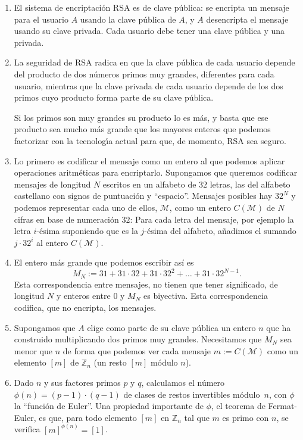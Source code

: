 \begin{enumerate}
 \item El sistema de encriptaci\'on RSA es de clave p\'ublica: se encripta un
mensaje para el usuario $A$ usando la clave p\'ublica de $A$, y $A$ desencripta
el mensaje usando su clave privada. Cada usuario debe tener una clave p\'ublica
y una privada. 
 \item La seguridad de RSA radica en que la clave p\'ublica de cada usuario
depende del producto de dos n\'umeros primos muy grandes, diferentes para cada
usuario, mientras que la clave privada de cada usuario depende de los dos primos
cuyo producto forma parte de su clave p\'ublica.
 
 Si los primos son muy grandes su producto lo es m\'as, y basta que ese producto
sea mucho m\'as grande que los mayores enteros que podemos factorizar con la
tecnolog\'{\i}a actual para que, de momento, RSA sea seguro.
 
 \item Lo primero es codificar el mensaje como un entero al que podemos aplicar
operaciones aritm\'eticas para encriptarlo.  Supongamos que queremos codificar
mensajes de longitud $N$ escritos en un alfabeto de $32$ letras, las del
alfabeto castellano con signos de puntuaci\'on y ``espacio''.  Mensajes posibles
hay $32^N$ y podemos representar cada uno de ellos, $\mathcal{M}$, como un 
entero
$C(\mathcal{M})$ de $N$ cifras en base de numeraci\'on $32$: Para cada letra del
mensaje, por ejemplo  la letra $i$-\'esima suponiendo que es la $j$-\'esima del
alfabeto,   a\~nadimos el sumando $j\cdot 32^i$ al entero $C(\mathcal{M})$. 
 
 \item El entero m\'as grande que podemos escribir as\'i es 
 \[M_{N}:=31+31\cdot 32+31\cdot 32^2+\dots+31\cdot 32^{N-1}.\]
 Esta correspondencia entre mensajes, no tienen que tener
significado, de longitud $N$ y enteros entre $0$ y $M_{N}$ es biyectiva. Esta 
correspondencia
codifica, que no encripta, los mensajes.
 
 \item  Supongamos que $A$ elige como parte de su clave p\'ublica un entero $n$ 
que
ha construido multiplicando dos primos muy grandes. Necesitamos que $M_{N}$ sea
menor que $n$ de forma que podemos ver cada mensaje $m:=C(\mathcal{M})$ como un
elemento $[m]$ de $\mathbb{Z}_n$ (un resto $[m]$ m\'odulo $n$). 
 
 \item Dado $n$ y sus factores primos $p$ y $q$, calculamos el n\'umero
$\phi(n)=(p-1)\cdot (q-1)$ de clases de restos invertibles m\'odulo~$n$, con
$\phi$  la ``funci\'on de Euler''. Una propiedad importante de $\phi$, el
teorema de Fermat-Euler,  es que, para todo elemento $[m]$ en $\mathbb{Z}_n$ tal
que $m$ es primo con $n$, se verifica 
 $[m]^{\phi(n)}=[1]$.
 

\end{enumerate}
